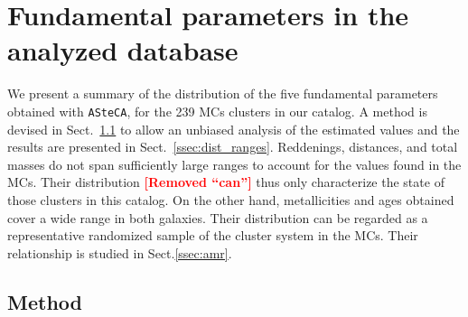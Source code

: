 \documentclass[draft]{aa}
\newcommand{\LEt}[1]{\textcolor{red}{\textbf{[#1]}}}
\begin{document}

\section{Fundamental parameters in the analyzed database}
\label{sec:param-dist}

We present a summary of the distribution of the five fundamental parameters
obtained with \texttt{ASteCA}, for the 239 MCs clusters in our catalog.
%
A method is devised in Sect.~\ref{ssec:kde_method} to allow an unbiased analysis
of the estimated values and the results are presented in
Sect.~\ref{ssec:dist_ranges}. Reddenings, distances, and total masses do not
span sufficiently large ranges to account for the values found in the MCs. Their
distribution \LEt{Removed ``can''} thus only characterize the state of those
clusters in this catalog.
%
On the other hand, metallicities and ages obtained cover a wide range in both
galaxies. Their distribution can be regarded as a representative randomized
sample of the cluster system in the MCs. Their relationship is studied in
Sect.\ref{ssec:amr}.

%




\subsection{Method}
\label{ssec:kde_method}
\end{document}
